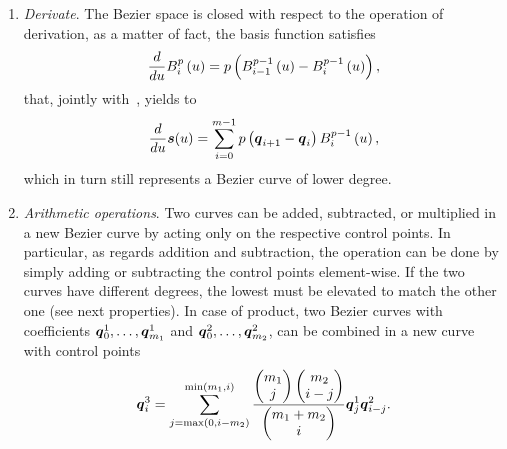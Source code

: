 \begin{enumerate}
    \item \emph{Derivate}.
    The B\acuteacc ezier space is closed with respect to the operation of derivation,
    as a matter of fact, the basis function satisfies
    \begin{equation*}
        \frac{d}{du}B_i^{p} \left( u \right) =
        p \left( B_{i-1}^{p-1} \left( u \right) - B_{i}^{p-1} \left( u \right) \right),
    \end{equation*}
    that, jointly with~, yields to
    \begin{equation*}
        \frac{d}{du}\boldsymbol{s}(u) =
        \sum_{i=0}^{m-1} p \left( \boldsymbol{q}_{i+1} - \boldsymbol{q}_{i} \right) B_i^{p-1} \left( u \right),
    \end{equation*}
    which in turn still represents a B\acuteacc ezier curve of lower degree.
    \item \emph{Arithmetic operations}. Two curves can be added, subtracted, or multiplied in a new
    B\acuteacc ezier curve by acting only on the respective control points. In particular, as regards addition and subtraction,
    the operation can be done by simply adding or subtracting the control points element-wise. If the two curves have different
    degrees, the lowest must be elevated to match the other one (see next properties). In case of product, two B\acuteacc ezier curves
    with coefficients $\boldsymbol{q}^1_0, \dots, \boldsymbol{q}^1_{m_1}$ and $\boldsymbol{q}^2_0, \dots, \boldsymbol{q}^2_{m_2}$,
    can be combined in a new curve with control points
    \begin{equation*}
        \bs{\cpoint}^3_i = \sum_{j = \max \lp 0, i-\cpnumber_2 \rp}^{\min \lp \cpnumber_1, i \rp}
        \frac{
            \begin{pmatrix}
                \cpnumber_1 \\ j
            \end{pmatrix}
            \begin{pmatrix}
                \cpnumber_2 \\ i-j
            \end{pmatrix}
        }{
            \begin{pmatrix}
                \cpnumber_1 + \cpnumber_2 \\ i
            \end{pmatrix}
        }
        \bs{\cpoint}^1_j \bs{\cpoint}^2_{i-j}.

\end{equation*}
\end{enumerate}

